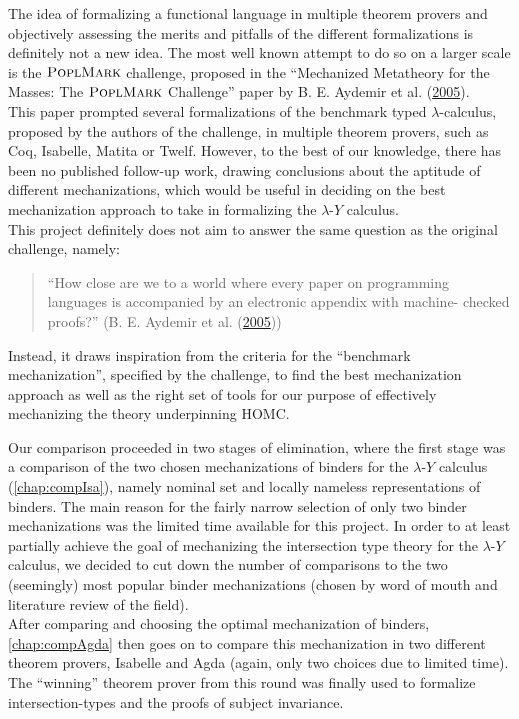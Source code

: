 \documentclass[a4paper, 12pt, twoside]{style/ociamthesis}
\theoremstyle{plain}
\theoremstyle{definition}
\theoremstyle{remark}
\newcommand{\lamy}{\lambda\text{-}Y}
\newcommand{\poplm}{\textsc{PoplMark}}
\begin{document}
The idea of formalizing a functional language in multiple theorem
provers and objectively assessing the merits and pitfalls of the
different formalizations is definitely not a new idea. The most well
known attempt to do so on a larger scale is the \(\poplm\) challenge,
proposed in the ``Mechanized Metatheory for the Masses: The \(\poplm\)
Challenge'' paper by B. E. Aydemir et al.
(\protect\hyperlink{ref-aydemir05}{2005}).\\
This paper prompted several formalizations of the benchmark typed
\(\lambda\)-calculus, proposed by the authors of the challenge, in
multiple theorem provers, such as Coq, Isabelle, Matita or Twelf.
However, to the best of our knowledge, there has been no published
follow-up work, drawing conclusions about the aptitude of different
mechanizations, which would be useful in deciding on the best
mechanization approach to take in formalizing the \(\lamy\) calculus.\\
This project definitely does not aim to answer the same question as the
original challenge, namely:

\begin{quote}
``How close are we to a world where every paper on programming languages
is accompanied by an electronic appendix with machine- checked proofs?''
(B. E. Aydemir et al. (\protect\hyperlink{ref-aydemir05}{2005}))
\end{quote}

Instead, it draws inspiration from the criteria for the ``benchmark
mechanization'', specified by the challenge, to find the best
mechanization approach as well as the right set of tools for our purpose
of effectively mechanizing the theory underpinning HOMC.

Our comparison proceeded in two stages of elimination, where the first
stage was a comparison of the two chosen mechanizations of binders for
the \(\lamy\) calculus (\cref{chap:compIsa}), namely nominal set and
locally nameless representations of binders. The main reason for the
fairly narrow selection of only two binder mechanizations was the
limited time available for this project. In order to at least partially
achieve the goal of mechanizing the intersection type theory for the
\(\lamy\) calculus, we decided to cut down the number of comparisons to
the two (seemingly) most popular binder mechanizations (chosen by word
of mouth and literature review of the field).\\
After comparing and choosing the optimal mechanization of binders,
\cref{chap:compAgda} then goes on to compare this mechanization in two
different theorem provers, Isabelle and Agda (again, only two choices
due to limited time).\\
The ``winning'' theorem prover from this round was finally used to
formalize intersection-types and the proofs of subject invariance.
\end{document}
